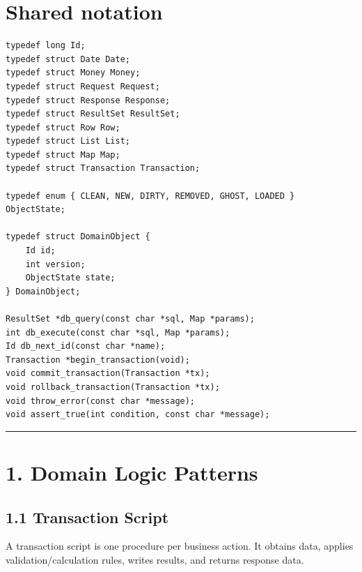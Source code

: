 \documentclass[11pt]{article}
\begin{document}
\section{Shared notation}\label{shared-notation}

\begin{verbatim}
typedef long Id;
typedef struct Date Date;
typedef struct Money Money;
typedef struct Request Request;
typedef struct Response Response;
typedef struct ResultSet ResultSet;
typedef struct Row Row;
typedef struct List List;
typedef struct Map Map;
typedef struct Transaction Transaction;

typedef enum { CLEAN, NEW, DIRTY, REMOVED, GHOST, LOADED } ObjectState;

typedef struct DomainObject {
    Id id;
    int version;
    ObjectState state;
} DomainObject;

ResultSet *db_query(const char *sql, Map *params);
int db_execute(const char *sql, Map *params);
Id db_next_id(const char *name);
Transaction *begin_transaction(void);
void commit_transaction(Transaction *tx);
void rollback_transaction(Transaction *tx);
void throw_error(const char *message);
void assert_true(int condition, const char *message);
\end{verbatim}

\begin{center}\rule{0.5\linewidth}{0.5pt}\end{center}

\section{1. Domain Logic Patterns}\label{domain-logic-patterns}

\subsection{1.1 Transaction Script}\label{transaction-script}

A transaction script is one procedure per business action. It obtains
data, applies validation/calculation rules, writes results, and returns
response data.
\end{document}
